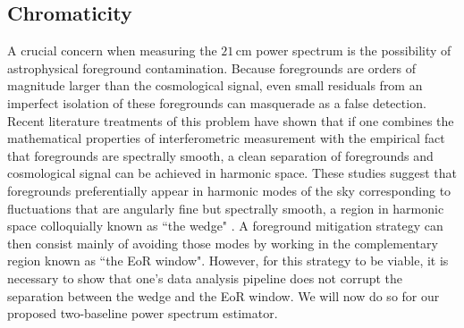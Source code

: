 \documentclass[twocolumn,apj,numberedappendix]{emulateapj}
\renewcommand\[{\begin{equation}}
\renewcommand\]{\end{equation}}
\begin{document}
\subsection{Chromaticity \label{sec:chromaticity}}


A crucial concern when measuring the $21\,\textrm{cm}$ power spectrum is the possibility of astrophysical foreground contamination. Because foregrounds are orders of magnitude larger than the cosmological signal, even small residuals from an imperfect isolation of these foregrounds can masquerade as a false detection. Recent literature treatments of this problem have shown that if one combines the mathematical properties of interferometric measurement with the empirical fact that foregrounds are spectrally smooth, a clean separation of foregrounds and cosmological signal can be achieved in harmonic space. These studies suggest that foregrounds preferentially appear in harmonic modes of the sky corresponding to fluctuations that are angularly fine but spectrally smooth, a region in harmonic space colloquially known as ``the wedge" \citep{Datta2010,Vedantham2012,Morales2012,delay-transform,Trott2012,Thyagarajan2013,pober_et_al2013b,dillon_et_al2014,Hazelton2013,Thyagarajan_et_al2015a,Thyagarajan_et_al2015b,wedge1, wedge2,chapman_et_al2016,pober_et_al2016,seo_and_hirata2016,jensen_et_al2016,kohn_et_al2016}. A foreground mitigation strategy can then consist mainly of avoiding those modes by working in the complementary region known as ``the EoR window". However, for this strategy to be viable, it is necessary to show that one's data analysis pipeline does not corrupt the separation between the wedge and the EoR window. We will now do so for our proposed two-baseline power spectrum estimator.



\end{document}
